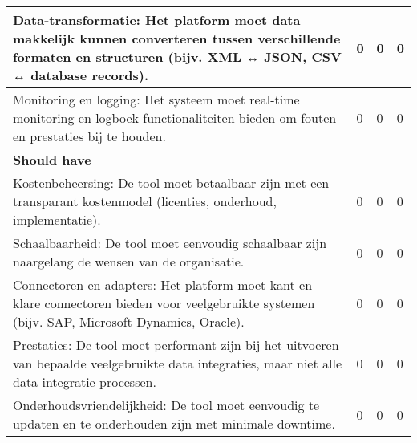 \begin{landscape}
\begin{table}[H]
{\begin{tabular}{|llll|}
\multicolumn{1}{|l|}{Data-transformatie: Het platform moet data makkelijk kunnen converteren tussen verschillende formaten en structuren (bijv. XML ↔ JSON, CSV ↔ database records).}                                      & \multicolumn{1}{l|}{0}              & \multicolumn{1}{l|}{0}               & 0                     \\ \hline
\multicolumn{1}{|l|}{Monitoring en logging: Het systeem moet real-time monitoring en logboek functionaliteiten bieden om fouten en prestaties bij te houden.}                                                              & \multicolumn{1}{l|}{0}              & \multicolumn{1}{l|}{0}               & 0                     \\ \hline
\textbf{Should have}                                                                                                                                                                                                       &                                     &                                      &                       \\ \hline
\multicolumn{1}{|l|}{Kostenbeheersing: De tool moet betaalbaar zijn met een transparant kostenmodel (licenties, onderhoud, implementatie).}                                                                                & \multicolumn{1}{l|}{0}              & \multicolumn{1}{l|}{0}               & 0                     \\ \hline
\multicolumn{1}{|l|}{Schaalbaarheid: De tool moet eenvoudig schaalbaar zijn naargelang de wensen van de organisatie.}                                                                                                      & \multicolumn{1}{l|}{0}              & \multicolumn{1}{l|}{0}               & 0                     \\ \hline
\multicolumn{1}{|l|}{Connectoren en adapters: Het platform moet kant-en-klare connectoren bieden voor veelgebruikte systemen (bijv. SAP, Microsoft Dynamics, Oracle).}                                                     & \multicolumn{1}{l|}{0}              & \multicolumn{1}{l|}{0}               & 0                     \\ \hline
\multicolumn{1}{|l|}{Prestaties: De tool moet performant zijn bij het uitvoeren van bepaalde veelgebruikte data integraties, maar niet alle data integratie processen.}                                                    & \multicolumn{1}{l|}{0}              & \multicolumn{1}{l|}{0}               & 0                     \\ \hline
\multicolumn{1}{|l|}{Onderhoudsvriendelijkheid: De tool moet eenvoudig te updaten en te onderhouden zijn met minimale downtime.}                                                                                           & \multicolumn{1}{l|}{0}              & \multicolumn{1}{l|}{0}               & 0                     \\ \hline

\end{tabular}}
\end{table}
\end{landscape}

